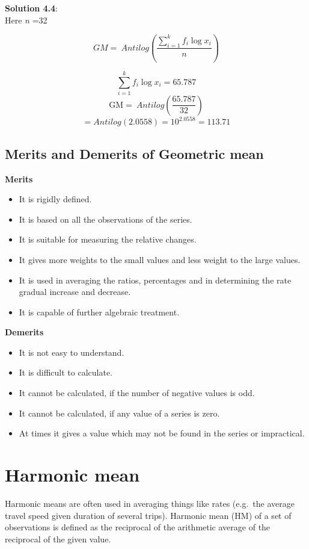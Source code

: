 \documentclass[
]{book}
\begin{document}
\textbf{Solution 4.4}:\\
Here \emph{n} =32

\[GM = \ Antilog\left( \frac{\sum_{i = 1}^{k}{{f_{i}\log}x_{i}}}{n} \right)\]

\[{\sum_{i = 1}^{k}{{f_{i}\log}x_{i}} = 65.787}\]
\[{\text{GM} = \ Antilog\left( \frac{65.787}{32} \right)}\]
\[{= Antilog\left( 2.0558 \right) = 10^{2.0558} = 113.71}\]

\subsection{Merits and Demerits of Geometric mean}\label{merits-and-demerits-of-geometric-mean}

{\textbf{Merits}}

\begin{itemize}
\item
  It is rigidly defined.
\item
  It is based on all the observations of the series.
\item
  It is suitable for measuring the relative changes.
\item
  It gives more weights to the small values and less weight to the
  large values.
\item
  It is used in averaging the ratios, percentages and in determining
  the rate gradual increase and decrease.
\item
  It is capable of further algebraic treatment.
\end{itemize}

{\textbf{Demerits}}

\begin{itemize}
\item
  It is not easy to understand.
\item
  It is difficult to calculate.
\item
  It cannot be calculated, if the number of negative values is odd.
\item
  It cannot be calculated, if any value of a series is zero.
\item
  At times it gives a value which may not be found in the series or
  impractical.
\end{itemize}

\section{Harmonic mean}\label{harmonic-mean}

Harmonic means are often used in averaging things like rates (e.g.~the
average travel speed given duration of several trips). Harmonic mean
(HM) of a set of observations is defined as the reciprocal of the
arithmetic average of the reciprocal of the given value.
\end{document}
